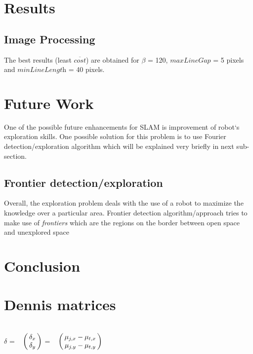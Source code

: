 \documentclass{ba-kecs}
\numberwithin{figure}{section}
\numberwithin{equation}{section}
\begin{document}

\section{Results}

\subsection{Image Processing}
The best results (least $\overline{\textit{cost}}$) are obtained for $\beta$ = 120,  $\textit{maxLineGap}$ = 5 pixels and $\textit{minLineLength}$ = 40 pixels.


\section{Future Work}

	One of the possible future enhancements for SLAM is improvement of robot`s exploration skills. One possible solution for this problem is to use Fourier detection/exploration algorithm which will be explained very briefly in next sub-section.
	
\subsection{Frontier detection/exploration}
	Overall, the exploration problem deals with the use of a robot to maximize the knowledge over a particular area. Frontier detection algorithm/approach tries to make use of \textit{frontiers} which are the regions on the border between open space and unexplored space \cite{frontier}


\section{Conclusion}


\section{Dennis matrices}

$\delta$ = $\bordermatrix{~ \cr
                  			& \delta_{x}  \cr
                  			& \delta_{y}}$ = $\bordermatrix{~ \cr
												& \mu_{j,x} - \mu_{t,x} \cr
                  								& \mu_{j,y} - \mu_{t,y} \cr}$\\ \\
\end{document}

